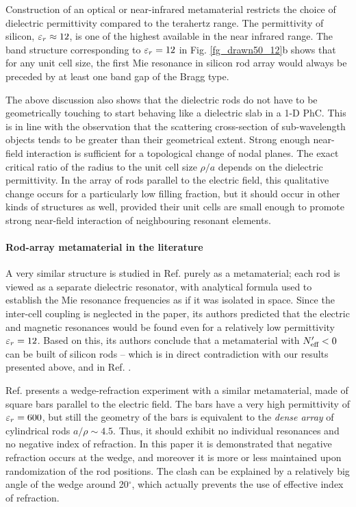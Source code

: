 Construction of an optical or near-infrared metamaterial restricts the choice of dielectric permittivity compared to the terahertz range. 
The permittivity of silicon, $\varepsilon_r \approx 12$, is one of the highest available in the near infrared range. The band structure corresponding to $\varepsilon_r=12$ in Fig. \ref{fg_drawn50_12}b shows that for any unit cell size, the first Mie resonance in silicon rod array would always be preceded by at least one band gap of the Bragg type. 

The above discussion also shows that the dielectric rods do not have to be geometrically touching to start behaving like a dielectric slab in a 1-D PhC. This is in line with the observation that the scattering cross-section of sub-wavelength objects tends to be greater than their geometrical extent.
Strong enough near-field interaction is sufficient for a topological change of nodal planes. The exact critical ratio of the radius to the unit cell size $\rho/a$ depends on the dielectric permittivity. In the array of rods parallel to the electric field, this qualitative change occurs for a particularly low filling fraction, but it should occur in other kinds of structures as well, provided their unit cells are small enough to promote strong near-field interaction of neighbouring resonant elements.

\paragraph{Rod-array metamaterial in the literature} %
A very similar structure is studied in Ref. \cite{vynck2009all} purely as a metamaterial; each rod is viewed as a separate dielectric resonator, with analytical formula used to establish the Mie resonance frequencies as if it was isolated in space. Since the inter-cell coupling is neglected in the paper, its authors predicted that the electric and magnetic resonances would be found even for a relatively low permittivity $\varepsilon_r = 12$. Based on this, its authors conclude that a metamaterial with $N_{\text{eff} }'<0$ can be built of silicon rods -- which is in direct contradiction with our results presented above, and in Ref. \cite{dominec2014transition}.

Ref. \cite{peng2007} presents a wedge-refraction experiment with a similar metamaterial, made of square bars parallel to the electric field. The bars have a very high permittivity of $\varepsilon_r=600$, but still the geometry of the bars is equivalent to the \textit{dense array} of cylindrical rods $a/\rho \sim 4.5$. Thus, it should exhibit no individual resonances and no negative index of refraction. In this paper it is demonstrated  \cite[Fig. 3bc]{peng2007} that negative refraction occurs at the wedge, and moreover it is more or less maintained upon randomization of the rod positions.
The clash can be explained by a relatively big angle of the wedge around 20$^\circ$, which actually prevents the use of effective index of refraction. %

